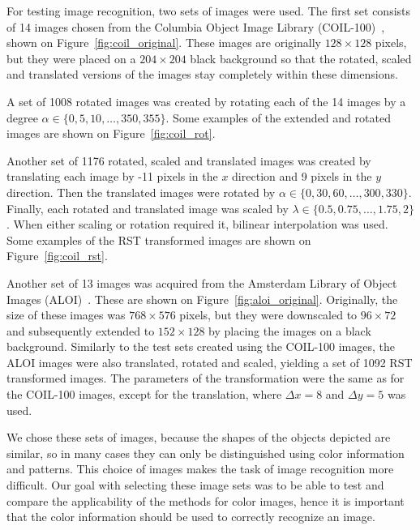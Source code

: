 For testing image recognition, two sets of images were used. The first set consists of 14 images chosen from the Columbia Object Image Library (COIL-100)~\cite{coil}, shown on Figure~\ref{fig:coil_original}. These images are originally $128 \times 128$ pixels, but they were placed on a $204 \times 204$ black background so that the rotated, scaled and translated versions of the images stay completely within these dimensions. 

A set of 1008 rotated images was created by rotating each of the 14 images by a degree $\alpha\in\{0,5,10,\ldots,350,355\}$. Some examples of the extended and rotated images are shown on Figure~\ref{fig:coil_rot}.

Another set of 1176 rotated, scaled and translated images was created by translating each image by -11 pixels in the $x$ direction and 9 pixels in the $y$ direction. Then the translated images were rotated by $\alpha \in \{0,30,60,\ldots,300,330\}$. Finally, each rotated and translated image was scaled by $\lambda \in \{0.5, 0.75, \ldots, 1.75, 2\}$. When either scaling or rotation required it, bilinear interpolation was used.
Some examples of the RST transformed images are shown on Figure~\ref{fig:coil_rst}.


Another set of 13 images was acquired from the Amsterdam Library of Object Images (ALOI)~\cite{aloi}. These are shown on Figure~\ref{fig:aloi_original}. Originally, the size of these images was $768 \times 576$ pixels, but they were downscaled to $96 \times 72$ and subsequently extended to $152 \times 128$ by placing the images on a black background. Similarly to the test sets created using the COIL-100 images, the ALOI images were also translated, rotated and scaled, yielding a set of 1092 RST transformed images. The parameters of the transformation were the same as for the COIL-100 images, except for the translation, where $\Delta x = 8$ and $\Delta y = 5$ was used.

We chose these sets of images, because the shapes of the objects depicted are similar, so in many cases they can only be distinguished using color information and patterns. This choice of images makes the task of image recognition more difficult. Our goal with selecting these image sets was to be able to test and compare the applicability of the methods for color images, hence it is important that the color information should be used to correctly recognize an image. 

